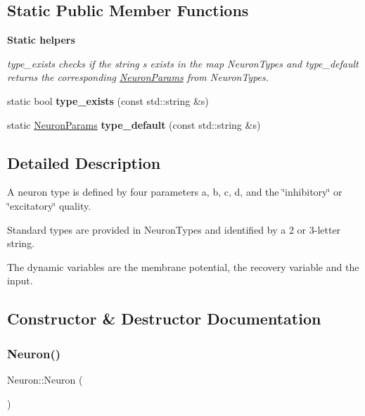 \subsection*{Static Public Member Functions}
\begin{Indent}\textbf{ Static helpers}\par
{\em type\+\_\+exists checks if the string {\ttfamily s} exists in the map Neuron\+Types and type\+\_\+default returns the corresponding \hyperlink{structNeuronParams}{Neuron\+Params} from Neuron\+Types. }\begin{DoxyCompactItemize}
\item 
\mbox{\label{classNeuron_a3a80c93e7cf5214b5e1a9925742bbe8e}} 
static bool {\bfseries type\+\_\+exists} (const std\+::string \&s)
\item 
\mbox{\label{classNeuron_a4e5c4e0a512460dd59449a0bec4d0db7}} 
static \hyperlink{structNeuronParams}{Neuron\+Params} {\bfseries type\+\_\+default} (const std\+::string \&s)
\end{DoxyCompactItemize}
\end{Indent}


\subsection{Detailed Description}
A neuron type is defined by four parameters {\ttfamily a}, {\ttfamily b}, {\ttfamily c}, {\ttfamily d}, and the \char`\"{}inhibitory\char`\"{} or \char`\"{}excitatory\char`\"{} quality.

Standard types are provided in Neuron\+Types and identified by a 2 or 3-\/letter string.

The dynamic variables are the membrane potential, the recovery variable and the input. 

\subsection{Constructor \& Destructor Documentation}
\mbox{\label{classNeuron_a823487d01615fadb8ac19a2768dd9d96}} 
\subsubsection{\texorpdfstring{Neuron()}{Neuron()}}
{\footnotesize\ttfamily Neuron\+::\+Neuron (\begin{DoxyParamCaption}{ }\end{DoxyParamCaption})}

